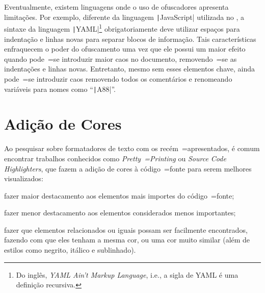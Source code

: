 Eventualmente,
existem linguagens onde o uso de ofuscadores apresenta limitações.
Por exemplo,
diferente da linguagem \texttt|JavaScript| utilizada no ,
a sintaxe da linguagem \texttt|YAML|\footnote{
Do inglês,
\textit{YAML Ain't Markup Language},
i.e.,
a sigla de YAML é uma definição recursiva.
}
\cite{yamlSpecificModelChecking} obrigatoriamente deve utilizar espaços para indentação e
linhas novas para separar blocos de informação.
Tais características enfraquecem o poder do ofuscamento uma vez que ele possui um maior efeito quando pode~=se introduzir maior caos no documento,
removendo~=se as indentações e
linhas novas. Entretanto,
mesmo sem esses elementos chave,
ainda pode~=se introduzir caos removendo todos os comentários e
renomeando variáveis para nomes  como ``\texttt|A88|''.


\section{Adição de Cores}
\label{section:sourceCodeHighlighters}

Ao pesquisar sobre formatadores de texto com os recém~=apresentados,
é comum encontrar trabalhos conhecidos como \textit{Pretty~=Printing} ou
\textit{Source Code Highlighters},
que fazem a adição de cores à código~=fonte para serem melhores visualizados:
\begin{inparaenum}[1)]
\item fazer maior destacamento aos elementos mais importes do código~=fonte;
\item fazer menor destacamento aos elementos considerados menos importantes;
\item fazer que elementos relacionados ou
iguais possam ser facilmente encontrados,
fazendo com que eles tenham a mesma cor,
ou uma cor muito similar (além de estilos como negrito,
itálico e
sublinhado).
\end{inparaenum}%

